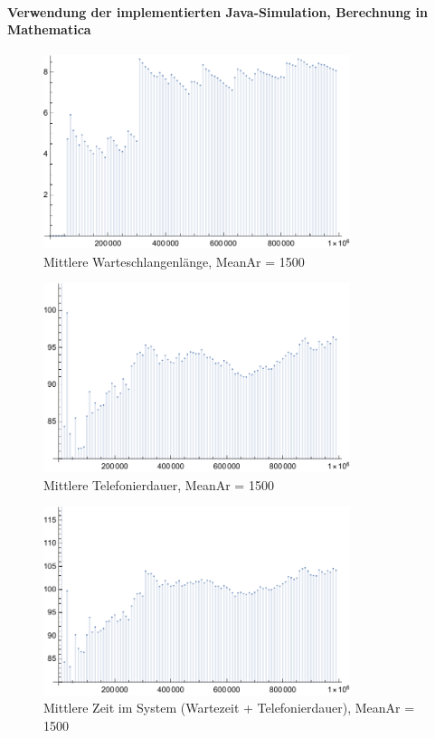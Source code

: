 \paragraph{Verwendung der implementierten Java-Simulation, Berechnung in Mathematica}
\begin{figure}[htpb]
	\centering
	\includegraphics[width=0.8\textwidth]{abbildungen/auswertung1500/meanQueueTimePlot.pdf}
	\caption{Mittlere Warteschlangenlänge, MeanAr = 1500}
	\label{fig:meanQueueTime1500}
\end{figure}

\begin{figure}[htpb]
	\centering
	\includegraphics[width=0.8\textwidth]{abbildungen/auswertung1500/meanCallingTimePlot.pdf}
	\caption{Mittlere Telefonierdauer, MeanAr = 1500}
	\label{fig:meanCallingTime1500}
\end{figure}

\begin{figure}[htpb]
	\centering
	\includegraphics[width=0.8\textwidth]{abbildungen/auswertung1500/meanSystemTimePlot.pdf}
	\caption{Mittlere Zeit im System (Wartezeit + Telefonierdauer), MeanAr = 1500}
	\label{fig:meanSystemTime1500}
\end{figure}
